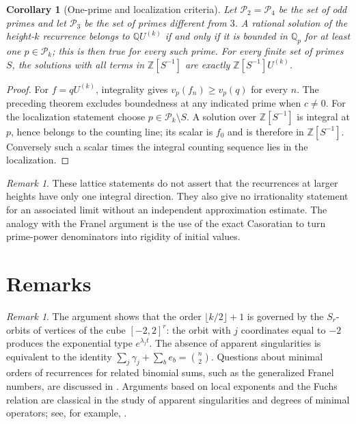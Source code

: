 \documentclass[11pt,a4paper]{article}
\newtheorem{corollary}[theorem]{Corollary}
\theoremstyle{definition}
\theoremstyle{remark}
\newtheorem{remark}[theorem]{Remark}
\numberwithin{equation}{section}
\newcommand{\Q}{\mathbb{Q}}
\newcommand{\Z}{\mathbb{Z}}
\newcommand{\fl}[1]{\lfloor #1\rfloor}
\begin{document}
\begin{corollary}[One-prime and localization criteria]\label{bfk:cor:bfk-localization}
Let $\mathcal P_2=\mathcal P_4$ be the set of odd primes and let
$\mathcal P_3$ be the set of primes different from $3$.
A rational solution of the height-$k$ recurrence belongs to
$\Q U^{(k)}$ if and only if it is bounded in $\Q_p$ for at least one
$p\in\mathcal P_k$; this is then true for every such prime.
For every finite set of primes $S$, the solutions with all terms in
$\Z[S^{-1}]$ are exactly $\Z[S^{-1}]U^{(k)}$.
\end{corollary}
\begin{proof}
For $f=qU^{(k)}$, integrality gives $v_p(f_n)\ge v_p(q)$ for every $n$.
The preceding theorem excludes boundedness at any indicated prime when
$c\ne0$. For the localization statement choose
$p\in\mathcal P_k\setminus S$. A solution over $\Z[S^{-1}]$ is integral
at $p$, hence belongs to the counting line; its scalar is $f_0$ and is
therefore in $\Z[S^{-1}]$. Conversely such a scalar times the integral
counting sequence lies in the localization.
\end{proof}

\begin{remark}
These lattice statements do not assert that the recurrences at larger
heights have only one integral direction. They also give no irrationality
statement for an associated limit without an independent approximation
estimate. The analogy with the Franel argument is the use of the exact
Casoratian to turn prime-power denominators into rigidity of initial values.
\end{remark}

\section{Remarks}\label{bfk:sec:rem}

\begin{remark}
The argument shows that the order $\fl{k/2}+1$ is governed by the $S_r$-orbits of vertices of the cube $[-2,2]^r$: the orbit with $j$ coordinates equal to $-2$ produces the exponential type $e^{\lambda_jt}$. The absence of apparent singularities is equivalent to the identity $\sum_j\gamma_j+\sum_be_b=\binom n2$. Questions about minimal orders of recurrences for related binomial sums, such as the generalized Franel numbers, are discussed in \cite{SZ23}. Arguments based on local exponents and the Fuchs relation are classical in the study of apparent singularities and degrees of minimal operators; see, for example, \cite{BCLSS07,BRS}.
\end{remark}
\end{document}
